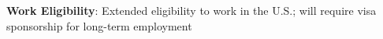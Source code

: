 \textbf{Work Eligibility}: Extended eligibility to work in the U.S.; will require visa sponsorship for long-term employment